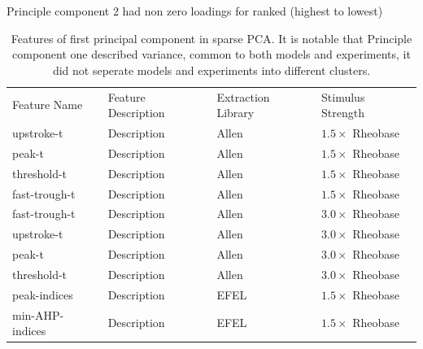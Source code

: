 Principle component 2 had non zero loadings for ranked (highest to lowest)
\begin{table}
\begin{tabular}{llll}
\toprule
Feature Name & Feature Description & Extraction Library &  Stimulus Strength \\
 upstroke-t & Description & Allen & $1.5 \times$ Rheobase\\
 peak-t & Description & Allen & $1.5 \times$ Rheobase \\
threshold-t & Description & Allen & $1.5 \times$ Rheobase \\
fast-trough-t & Description & Allen & $1.5 \times$ Rheobase \\ 
fast-trough-t & Description & Allen & $3.0 \times$ Rheobase \\
upstroke-t & Description & Allen & $3.0 \times$ Rheobase \\ 
peak-t & Description &Allen & $3.0 \times$ Rheobase \\ 
threshold-t & Description & Allen & $3.0 \times$ Rheobase \\ 
peak-indices & Description & EFEL & $1.5 \times$ Rheobase \\
min-AHP-indices & Description & EFEL & $1.5 \times$ Rheobase \\
\bottomrule
\end{tabular}
\caption[Features of first principal component in sparse PCA]{Features of first principal component in sparse PCA. It is notable that Principle component one described variance, common to both models and experiments, it did not seperate models and experiments into different clusters.}

\end{table}

